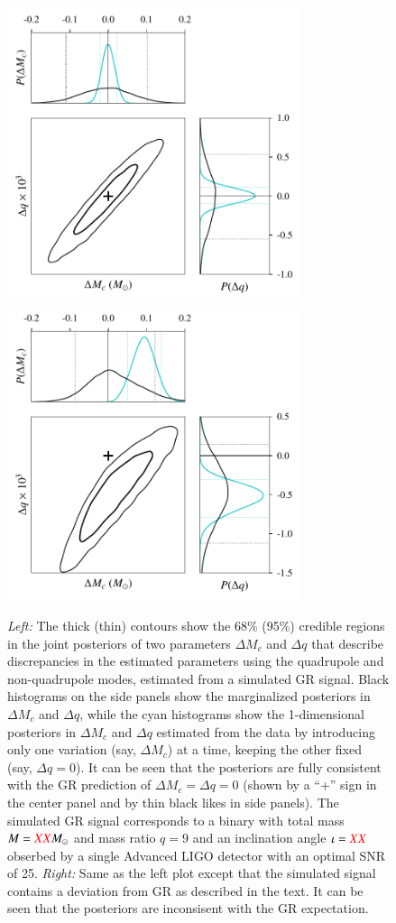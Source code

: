 \documentclass[prl,preprintnumbers,twocolumn,eqsecnum,floatfix,a4paper,nofootinbib,superscriptaddress]{revtex4}
\newcommand{\red}[1]{\textcolor{red}{#1}}
\begin{document}
\begin{figure}[htb] \begin{center}
\includegraphics[width=3.4in]{figs/fig1_GR.pdf}
\includegraphics[width=3.4in]{figs/fig1_modGR.pdf}
\caption{\emph{Left:} The thick (thin) contours show the 68\% (95\%) credible regions in the joint posteriors of two parameters $\Delta M_c$ and $\Delta q$ that describe discrepancies in the estimated parameters using the quadrupole and non-quadrupole modes, estimated from a simulated GR signal. Black histograms on the side panels show the marginalized posteriors in $\Delta M_c$ and $\Delta q$, while the cyan histograms show the 1-dimensional posteriors in $\Delta M_c$ and $\Delta q$ estimated from the data by introducing only one variation (say, $\Delta M_c$) at a time, keeping the other fixed (say, $\Delta q = 0$). It can be seen that the posteriors are fully consistent with the GR prediction of $\Delta M_c = \Delta q = 0$ (shown by a ``+'' sign in the center panel and by thin black likes in side panels).  The simulated GR signal corresponds to a binary with total mass $M = \red{XX}M_\odot$ and mass ratio $q = 9$ and an inclination angle $\iota = \red{XX}$ obserbed by a single Advanced LIGO detector with an optimal SNR of 25. \emph{Right:} Same as the left plot except that the simulated signal contains a deviation from GR as described in the text. It can be seen that the posteriors are inconsisent with the GR expectation.}
\label{fig:contour_plots}
\end{center} \end{figure}
\end{document}
